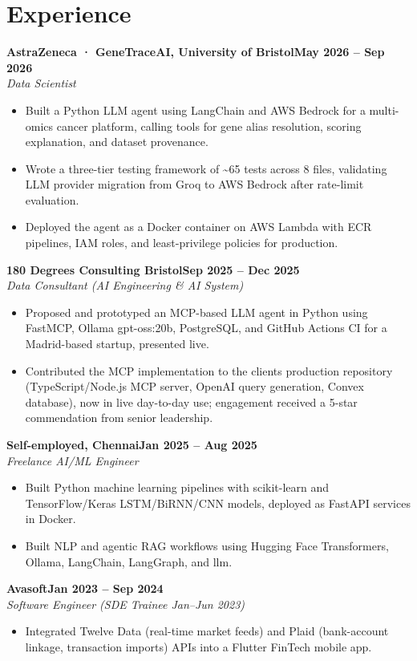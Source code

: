 \documentclass[a4paper,10pt]{article}
\newcommand{\entry}[4]{\noindent\textbf{#1}\hfill\textbf{#2}\\ \textit{#3}\hfill\textit{#4}\par}
\begin{document}
\section{Experience}
\entry{AstraZeneca · GeneTraceAI, University of Bristol}{May 2026 – Sep 2026}{Data Scientist}{}
\begin{itemize}
  \item Built a Python LLM agent using LangChain and AWS Bedrock for a multi-omics cancer platform, calling tools for gene alias resolution, scoring explanation, and dataset provenance.
  \item Wrote a three-tier testing framework of \textasciitilde{}65 tests across 8 files, validating LLM provider migration from Groq to AWS Bedrock after rate-limit evaluation.
  \item Deployed the agent as a Docker container on AWS Lambda with ECR pipelines, IAM roles, and least-privilege policies for production.
\end{itemize}
\vspace{3pt}
\entry{180 Degrees Consulting Bristol}{Sep 2025 – Dec 2025}{Data Consultant (AI Engineering \& AI System)}{}
\begin{itemize}
  \item Proposed and prototyped an MCP-based LLM agent in Python using FastMCP, Ollama gpt-oss:20b, PostgreSQL, and GitHub Actions CI for a Madrid-based startup, presented live.
  \item Contributed the MCP implementation to the client\textquotesingle{}s production repository (TypeScript/Node.js MCP server, OpenAI query generation, Convex database), now in live day-to-day use; engagement received a 5-star commendation from senior leadership.
\end{itemize}
\vspace{3pt}
\entry{Self-employed, Chennai}{Jan 2025 – Aug 2025}{Freelance AI/ML Engineer}{}
\begin{itemize}
  \item Built Python machine learning pipelines with scikit-learn and TensorFlow/Keras LSTM/BiRNN/CNN models, deployed as FastAPI services in Docker.
  \item Built NLP and agentic RAG workflows using Hugging Face Transformers, Ollama, LangChain, LangGraph, and llm.
\end{itemize}
\vspace{3pt}
\entry{Avasoft}{Jan 2023 – Sep 2024}{Software Engineer (SDE Trainee Jan–Jun 2023)}{}
\begin{itemize}
  \item Integrated Twelve Data (real-time market feeds) and Plaid (bank-account linkage, transaction imports) APIs into a Flutter FinTech mobile app.
\end{itemize}
\end{document}
